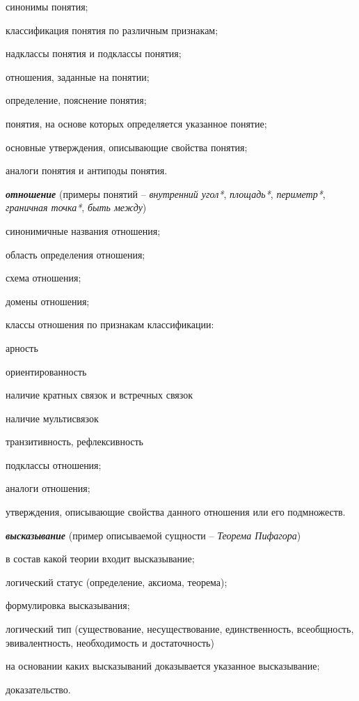 \begin{textitemize}
	\item синонимы понятия;
	\item классификация понятия по различным признакам;
	\item надклассы понятия и подклассы понятия;
	\item отношения, заданные на понятии;
	\item определение, пояснение понятия;
	\item понятия, на основе которых определяется указанное понятие;
	\item основные утверждения, описывающие свойства понятия;
	\item аналоги понятия и антиподы понятия.
\end{textitemize}

\textbf{\textit{отношение}} (примеры понятий -- \textit{внутренний угол*}, \textit{площадь*}, \textit{периметр*}, \textit{граничная точка*}, \textit{быть между\scnrolesign})

\begin{textitemize}
	\item синонимичные названия отношения;
	\item область определения отношения;
	\item схема отношения;
	\item домены отношения;
	\item классы отношения по признакам классификации:
	\begin{textitemize}
		\item арность
		\item ориентированность
		\item наличие кратных связок и встречных связок
		\item наличие мультисвязок
		\item транзитивность, рефлексивность
	\end{textitemize}
	\item подклассы отношения;
	\item аналоги отношения;
	\item утверждения, описывающие свойства данного отношения или его подмножеств.
\end{textitemize}

\textbf{\textit{высказывание}} (пример описываемой сущности -- \textit{Теорема Пифагора})

\begin{textitemize}
	\item в состав какой теории входит высказывание;
	\item логический статус (определение, аксиома, теорема);
	\item формулировка высказывания;
	\item логический тип (существование, несуществование, единственность, всеобщность, эвивалентность, необходимость и достаточность)
	\item на основании каких высказываний доказывается указанное высказывание;
	\item доказательство.
\end{textitemize}

